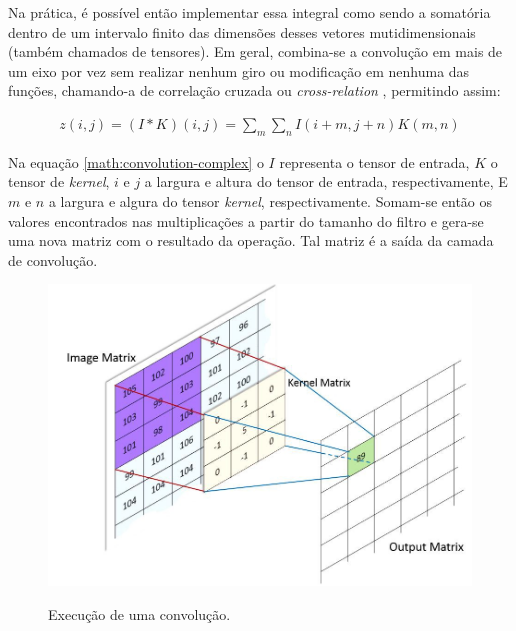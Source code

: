 Na prática, é possível então implementar essa integral como sendo a somatória dentro de um intervalo finito das dimensões desses vetores mutidimensionais (também chamados de tensores). Em geral, combina-se a convolução em mais de um eixo por vez sem realizar nenhum giro ou modificação em nenhuma das funções, chamando-a de correlação cruzada ou \textit{cross-relation} \cite{goodfellow-et-al-2016}, permitindo assim:

\begin{gather}
  z(i, j) = (I * K)(i, j) = \sum_{m} \sum_{n} I(i + m, j + n)K(m,n)
  \label{math:convolution-complex}
\end{gather}

Na equação \ref{math:convolution-complex} o $I$ representa o tensor de entrada, $K$ o tensor de \textit{kernel}, $i$ e $j$ a largura e altura do tensor de entrada, respectivamente, E $m$ e $n$ a largura e algura do tensor \textit{kernel}, respectivamente. Somam-se então os valores encontrados nas multiplicações a partir do tamanho do filtro e gera-se uma nova matriz com o resultado da operação. Tal matriz é a saída da camada de convolução.
\\

\begin{figure}[H]
  \centering
  \caption{Execução de uma convolução.}
  \includegraphics[scale=0.35]{figuras/cnn-kernel-multiplication.jpeg}
  \label{fig:cnn-kernel-multiplication}
\end{figure}

